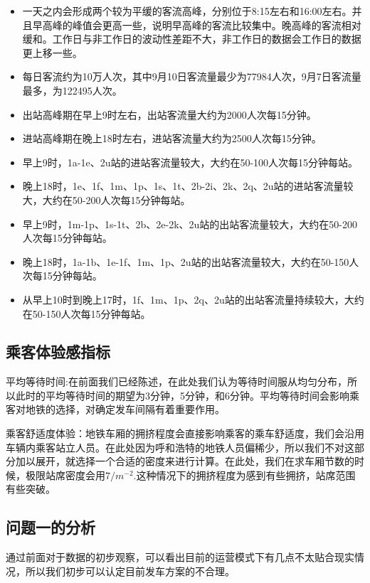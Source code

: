 \documentclass[12pt,a4paper]{mcmthesis}
\begin{document}
    \begin{itemize}
        \item 一天之内会形成两个较为平缓的客流高峰，分别位于8:15左右和16:00左右。并且早高峰的峰值会更高一些，说明早高峰的客流比较集中。晚高峰的客流相对缓和。工作日与非工作日的波动性差距不大，非工作日的数据会工作日的数据更上移一些。
        \item 每日客流约为10万人次，其中9月10日客流量最少为77984人次，9月7日客流量最多，为122495人次。
        \item 出站高峰期在早上9时左右，出站客流量大约为2000人次每15分钟。
        \item 进站高峰期在晚上18时左右，进站客流量大约为2500人次每15分钟。
        \item 早上9时，1a-1e、2u站的进站客流量较大，大约在50-100人次每15分钟每站。
        \item 晚上18时，1e、1f、1m、1p、1s、1t、2b-2i、2k、2q、2u站的进站客流量较大，大约在50-200人次每15分钟每站。
        \item 早上9时，1m-1p、1s-1t、2b、2e-2k、2u站的出站客流量较大，大约在50-200人次每15分钟每站。
        \item 晚上18时，1a-1b、1e-1f、1m、1p、2u站的出站客流量较大，大约在50-150人次每15分钟每站。
        \item 从早上10时到晚上17时，1f、1m、1p、2q、2u站的出站客流量持续较大，大约在50-150人次每15分钟每站。
    \end{itemize}

    \subsection{乘客体验感指标}
    平均等待时间:在前面我们已经陈述，在此处我们认为等待时间服从均匀分布，所以此时的平均等待时间的期望为3分钟，5分钟，和6分钟。平均等待时间会影响乘客对地铁的选择，对确定发车间隔有着重要作用。

    乘客舒适度体验：地铁车厢的拥挤程度会直接影响乘客的乘车舒适度，我们会沿用车辆内乘客站立人员。在此处因为呼和浩特的地铁人员偏稀少，所以我们不对这部分加以展开，就选择一个合适的密度来进行计算。在此处，我们在求车厢节数的时候，极限站席密度会用$7/m^{-2}$.这种情况下的拥挤程度为感到有些拥挤，站席范围有些突破。

    \subsection{问题一的分析}

    通过前面对于数据的初步观察，可以看出目前的运营模式下有几点不太贴合现实情况，所以我们初步可以认定目前发车方案的不合理。
\end{document}
